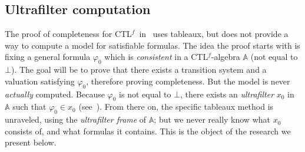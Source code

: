 \documentclass[11pt]{article}
\newcommand{\A}{{\mathbb{A}}}
\newcommand{\CTLf}{{CTL$^f$}}
\newcommand{\phii}{{\varphi}}
\theoremstyle{definition}
\begin{document}
\subsection*{Ultrafilter computation}

The proof of completeness for \CTLf~in~\cite[Section 3]{GhivG16} uses tableaux, but does not provide a way to compute a model for satisfiable formulas.
The idea the proof starts with is fixing a general formula $\phii_0$ which is \emph{consistent} in a \CTLf-algebra $\A$ (not equal to $\bot$).
The goal will be to prove that there exists a transition system  and a valuation satisfying $\phii_0$, therefore proving completeness. But 
the model is never \emph{actually} computed. Because $\phii_0$ is not equal to $\bot$, there exists an \emph{ultrafilter} $x_0$
in $\A$ such that $\phii_0 \in x_0$ (see~\cite[Section 3.3]{GehvG22}). From there on, the specific tableaux method is unraveled, using the 
\emph{ultrafilter frame} of $\A$; but we never really know what $x_0$ consists of, and what formulas it contains. This 
is the object of the research we present below.
\end{document}
